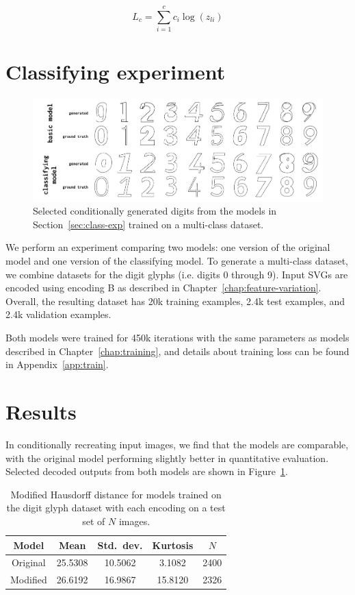 \begin{equation}
L_c = \sum_{i=1}^c c_i \log(z_{li})
\end{equation}

\section{Classifying experiment}
\begin{figure}[h]
    \centering
	\includegraphics[width=\textwidth]{figures/digits}
    \caption[Visual results for the multi-class digits models]
    {Selected conditionally generated digits from the models in Section~\ref{sec:class-exp} trained on a multi-class dataset.\label{fig:class-results}}
\end{figure}

We perform an experiment comparing two models: one version of the original model and one version of the classifying model.
To generate a multi-class dataset, we combine datasets for the digit glyphs (i.e. digits 0 through 9).
Input SVGs are encoded using encoding B as described in Chapter~\ref{chap:feature-variation}.
Overall, the resulting dataset has 20k training examples, 2.4k test examples, and 2.4k validation examples.

Both models were trained for 450k iterations with the same parameters as models described in Chapter~\ref{chap:training}, and details about training loss can be found in Appendix~\ref{app:train}.

\section{Results}
In conditionally recreating input images, we find that the models are comparable, with the original model performing slightly better in quantitative evaluation. Selected decoded outputs from both models are shown in Figure~\ref{fig:class-results}.

\begin{table}[h]
\centering
\caption[Quantitative results for evaluating multi-class models]
    {Modified Hausdorff distance for models trained on the digit glyph dataset with each encoding on a test set of $N$ images.\label{tbl:class-results}}
\begin{tabular}{c c c c c}
\toprule
    Model & Mean & Std.\ dev. & Kurtosis & $N$ \\ \midrule
    Original & 25.5308 & 10.5062 & 3.1082 & 2400 \\
    Modified & 26.6192 & 16.9867 & 15.8120 & 2326
\end{tabular}
\end{table}

